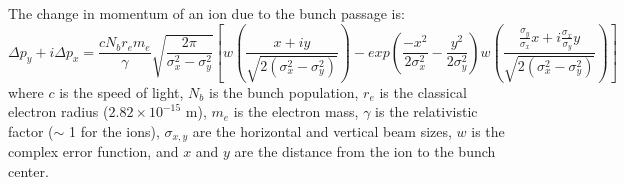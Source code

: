 The change in momentum of an ion due to the bunch passage is:
\begin{equation}
\Delta p_y + i \Delta p_x  = \frac{c N_b r_e m_e }{\gamma} \sqrt{\frac{2 \pi}{\sigma_x^2 - \sigma_y^2}} \left[ w\left(\frac{x + i y}{\sqrt{2 (\sigma_x^2 - \sigma_y^2)}}\right) 
   - exp\left(\frac{-x^2}{2 \sigma_x^2} - \frac{y^2}{2 \sigma_y^2}\right)  w\left(\frac{\frac{\sigma_y}{\sigma_x} x + i \frac{\sigma_x}{\sigma_y} y}{\sqrt{2 (\sigma_x^2 - \sigma_y^2)}}\right) \right]
\end{equation}
where $c$ is the speed of light, $N_b$ is the bunch population, $r_e$
is the classical electron radius ($2.82 \times 10^{-15}$ m), $m_e$ is
the electron mass, $\gamma$ is the relativistic factor ($\sim$ 1 for
the ions), $\sigma_{x,y}$ are the horizontal and vertical beam sizes,
$w$ is the complex error function, and $x$ and $y$ are the distance
from the ion to the bunch center.
